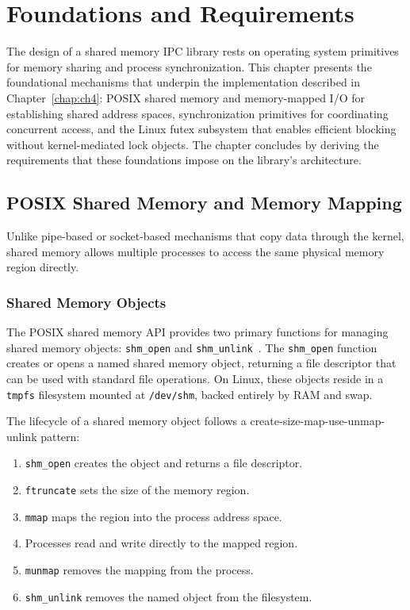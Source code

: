 \chapter{Foundations and Requirements}
\label{chap:ch2}


The design of a shared memory IPC library rests on operating system primitives for memory sharing and process synchronization. This chapter presents the foundational mechanisms that underpin the implementation described in Chapter~\ref{chap:ch4}: POSIX shared memory and memory-mapped I/O for establishing shared address spaces, synchronization primitives for coordinating concurrent access, and the Linux futex subsystem that enables efficient blocking without kernel-mediated lock objects. The chapter concludes by deriving the requirements that these foundations impose on the library's architecture.

\section{POSIX Shared Memory and Memory Mapping}
\label{sec:shm}

Unlike pipe-based or socket-based mechanisms that copy data through the kernel, shared memory allows multiple processes to access the same physical memory region directly.

\subsection{Shared Memory Objects}

The POSIX shared memory API provides two primary functions for managing shared memory objects: \texttt{shm\_open} and \texttt{shm\_unlink}~\cite{posix2017}. The \texttt{shm\_open} function creates or opens a named shared memory object, returning a file descriptor that can be used with standard file operations. On Linux, these objects reside in a \texttt{tmpfs} filesystem mounted at \texttt{/dev/shm}, backed entirely by RAM and swap.

The lifecycle of a shared memory object follows a create-size-map-use-unmap-unlink pattern:

\begin{enumerate}
    \item \texttt{shm\_open} creates the object and returns a file descriptor.
    \item \texttt{ftruncate} sets the size of the memory region.
    \item \texttt{mmap} maps the region into the process address space.
    \item Processes read and write directly to the mapped region.
    \item \texttt{munmap} removes the mapping from the process.
    \item \texttt{shm\_unlink} removes the named object from the filesystem.
\end{enumerate}

